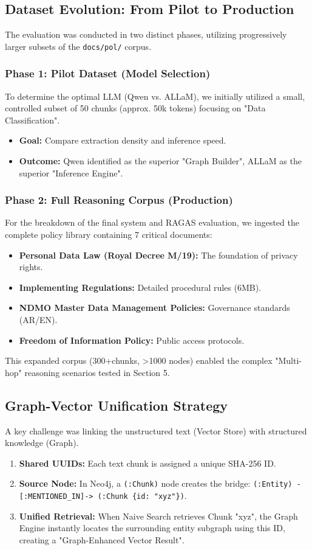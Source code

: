 \documentclass[11pt, onecolumn]{article}
\begin{document}
\subsection{Dataset Evolution: From Pilot to Production}
The evaluation was conducted in two distinct phases, utilizing progressively larger subsets of the \texttt{docs/pol/} corpus.

\subsubsection{Phase 1: Pilot Dataset (Model Selection)}
To determine the optimal LLM (Qwen vs. ALLaM), we initially utilized a small, controlled subset of 50 chunks (approx. 50k tokens) focusing on "Data Classification".
\begin{itemize}
    \item \textbf{Goal:} Compare extraction density and inference speed.
    \item \textbf{Outcome:} Qwen identified as the superior "Graph Builder", ALLaM as the superior "Inference Engine".
\end{itemize}

\subsubsection{Phase 2: Full Reasoning Corpus (Production)}
For the breakdown of the final system and RAGAS evaluation, we ingested the complete policy library containing 7 critical documents:
\begin{itemize}
    \item \textbf{Personal Data Law (Royal Decree M/19):} The foundation of privacy rights.
    \item \textbf{Implementing Regulations:} Detailed procedural rules (6MB).
    \item \textbf{NDMO Master Data Management Policies:} Governance standards (AR/EN).
    \item \textbf{Freedom of Information Policy:} Public access protocols.
\end{itemize}
This expanded corpus (300+chunks, >1000 nodes) enabled the complex "Multi-hop" reasoning scenarios tested in Section 5.

\subsection{Graph-Vector Unification Strategy}
A key challenge was linking the unstructured text (Vector Store) with structured knowledge (Graph).
\begin{enumerate}
    \item \textbf{Shared UUIDs:} Each text chunk is assigned a unique SHA-256 ID.
    \item \textbf{Source Node:} In Neo4j, a \texttt{(:Chunk)} node creates the bridge:
    \texttt{(:Entity) -[:MENTIONED\_IN]-> (:Chunk \{id: "xyz"\})}.
    \item \textbf{Unified Retrieval:} When Naive Search retrieves Chunk "xyz", the Graph Engine instantly locates the surrounding entity subgraph using this ID, creating a "Graph-Enhanced Vector Result".
\end{enumerate}
\end{document}
